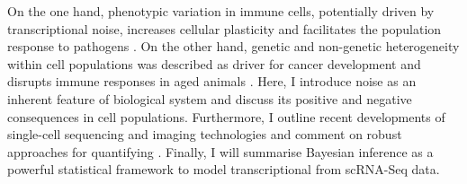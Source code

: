 \begin{Abstract}
On the one hand, phenotypic variation in immune cells, potentially driven by transcriptional noise, increases cellular plasticity and facilitates the population response to pathogens \citep{Shalek2014, Kellogg2015}. 
On the other hand, genetic and non-genetic heterogeneity within cell populations was described as driver for cancer development \citep{Marusyk2012} and disrupts immune responses in aged animals \citep{Martinez-jimenez2017}. 
Here, I introduce noise as an inherent feature of biological system and discuss its positive and negative consequences in cell populations. 
Furthermore, I outline recent developments of single-cell sequencing and imaging technologies and comment on robust approaches for quantifying . 
Finally, I will summarise Bayesian inference as a powerful statistical framework to model transcriptional  from \gls{scRNA-Seq} data.
\end{Abstract}

\newpage


\newpage

\newpage

\newpage

\newpage

\newpage


